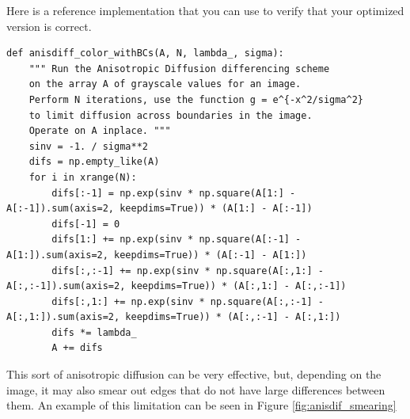 \begin{problem}
Here is a reference implementation that you can use to verify that your optimized version is correct.
\begin{lstlisting}
def anisdiff_color_withBCs(A, N, lambda_, sigma):
    """ Run the Anisotropic Diffusion differencing scheme
    on the array A of grayscale values for an image.
    Perform N iterations, use the function g = e^{-x^2/sigma^2}
    to limit diffusion across boundaries in the image.
    Operate on A inplace. """
    sinv = -1. / sigma**2
    difs = np.empty_like(A)
    for i in xrange(N):
        difs[:-1] = np.exp(sinv * np.square(A[1:] - A[:-1]).sum(axis=2, keepdims=True)) * (A[1:] - A[:-1])
        difs[-1] = 0
        difs[1:] += np.exp(sinv * np.square(A[:-1] - A[1:]).sum(axis=2, keepdims=True)) * (A[:-1] - A[1:])
        difs[:,:-1] += np.exp(sinv * np.square(A[:,1:] - A[:,:-1]).sum(axis=2, keepdims=True)) * (A[:,1:] - A[:,:-1])
        difs[:,1:] += np.exp(sinv * np.square(A[:,:-1] - A[:,1:]).sum(axis=2, keepdims=True)) * (A[:,:-1] - A[:,1:])
        difs *= lambda_
        A += difs
\end{lstlisting}
\end{problem}

This sort of anisotropic diffusion can be very effective, but, depending on the image, it may also smear out edges that do not have large differences between them.
An example of this limitation can be seen in Figure \ref{fig:anisdif_smearing}


